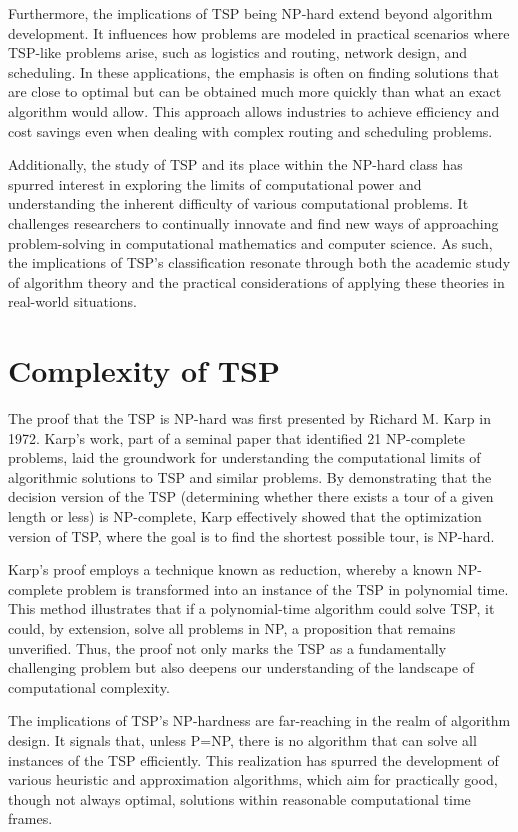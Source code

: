 Furthermore, the implications of TSP being NP-hard extend beyond algorithm development. It influences how problems are modeled in practical scenarios where TSP-like problems arise, such as logistics and routing, network design, and scheduling. In these applications, the emphasis is often on finding solutions that are close to optimal but can be obtained much more quickly than what an exact algorithm would allow. This approach allows industries to achieve efficiency and cost savings even when dealing with complex routing and scheduling problems.

Additionally, the study of TSP and its place within the NP-hard class has spurred interest in exploring the limits of computational power and understanding the inherent difficulty of various computational problems. It challenges researchers to continually innovate and find new ways of approaching problem-solving in computational mathematics and computer science. As such, the implications of TSP's classification resonate through both the academic study of algorithm theory and the practical considerations of applying these theories in real-world situations.


\section{Complexity of TSP}

The proof that the TSP is NP-hard was first presented by Richard M. Karp in 1972. Karp's work, part of a seminal paper that identified 21 NP-complete problems, laid the groundwork for understanding the computational limits of algorithmic solutions to TSP and similar problems. By demonstrating that the decision version of the TSP (determining whether there exists a tour of a given length or less) is NP-complete, Karp effectively showed that the optimization version of TSP, where the goal is to find the shortest possible tour, is NP-hard.

Karp's proof employs a technique known as reduction, whereby a known NP-complete problem is transformed into an instance of the TSP in polynomial time. This method illustrates that if a polynomial-time algorithm could solve TSP, it could, by extension, solve all problems in NP, a proposition that remains unverified. Thus, the proof not only marks the TSP as a fundamentally challenging problem but also deepens our understanding of the landscape of computational complexity.

The implications of TSP's NP-hardness are far-reaching in the realm of algorithm design. It signals that, unless P=NP, there is no algorithm that can solve all instances of the TSP efficiently. This realization has spurred the development of various heuristic and approximation algorithms, which aim for practically good, though not always optimal, solutions within reasonable computational time frames.

